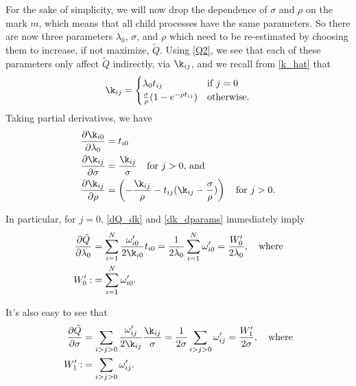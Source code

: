 \documentclass[12pt,leqno]{article}
\begin{document}
For the sake of simplicity, we will now drop the dependence of $\sigma$ and $\rho$ on the mark $m$, which means
that all child processes have the same parameters.  So there are now three parameters $\lambda_0$, $\sigma$, and
$\rho$ which need to be re-estimated by choosing them to increase, if not maximize, $\tilde{Q}$.  
Using \eqref{Q2}, we see that each of these parameters only affect $\tilde{Q}$ indirectly, via $\k_{ij}$, and we recall
from \eqref{k_hat} that
$$
\k_{ij} = \begin{cases}
\lambda_0t_{ij} & \text{if $j = 0$}\\
\frac{\sigma}{\rho}(1-e^{-\rho{t_{ij}}}) & \text{otherwise}.
\end{cases}
$$
Taking partial derivatives, we have
\begin{equation}\label{dk_dparams}
  \begin{split}
    \frac{\partial\k_{i0}}{\partial\lambda_0} &= 
        t_{i0} \\
    \frac{\partial\k_{ij}}{\partial\sigma} &= 
      \frac{\k_{ij}}{\sigma} \quad\text{for $j > 0$, and} \\
    \frac{\partial\k_{ij}}{\partial\rho} &=
    \left(-\frac{\k_{ij}}{\rho} -t_{ij}(\k_{ij} - \frac{\sigma}{\rho})\right)\quad\text{for } j > 0.
  \end{split}
\end{equation}





In particular, for $j = 0$,  \eqref{dQ_dk} and \eqref{dk_dparams} immediately imply
\begin{equation}\label{dQ_dlambda}
  \begin{split}
\frac{\partial\tilde{Q}}{\partial\lambda_0} &= \sum_{i=1}^N\frac{\omega'_{i0}}{2\k_{i0}}t_{i0} 
= \frac{1}{2\lambda_0}\sum_{i=1}^N\omega'_{i0} = \frac{W'_0}{2\lambda_0},\quad\text{where}\\
W'_0 :&= \sum_{i=1}^N\omega'_{i0}.
\end{split}
\end{equation}

It's also easy to see that
\begin{equation}\label{dQ_dsigma}
\begin{split}
  \frac{\partial\tilde{Q}}{\partial\sigma} &= \sum_{i>j>0}\frac{\omega'_{ij}}{2\k_{ij}}\frac{\k_{ij}}{\sigma} 
= \frac{1}{2\sigma}\sum_{i>j>0}\omega'_{ij} = \frac{W'_1}{2\sigma},
  \quad\text{where} \\
  W'_1 :&= \sum_{i>j>0}\omega'_{ij}.
  \end{split}
\end{equation}
\end{document}
